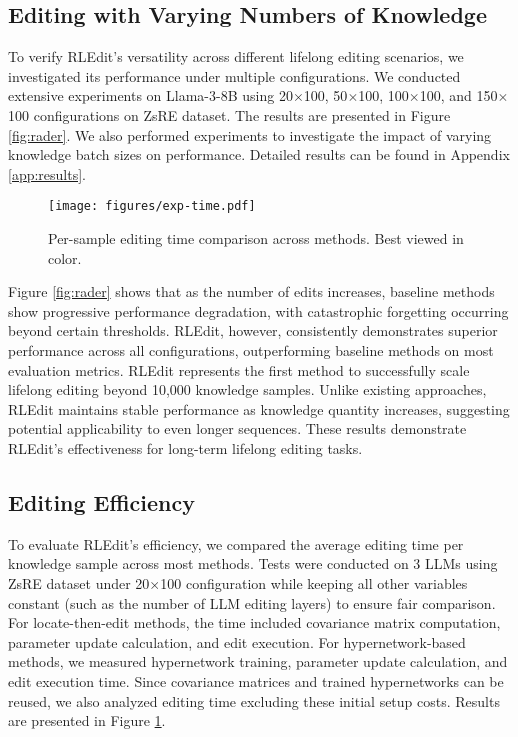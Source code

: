 \subsection{Editing with Varying Numbers of Knowledge}
To verify RLEdit's versatility across different lifelong editing scenarios, we investigated its performance under multiple configurations. We conducted extensive experiments on Llama-3-8B using 20$\times$100, 50$\times$100, 100$\times$100, and 150$\times$100 configurations on ZsRE dataset. The results are presented in Figure \ref{fig:rader}. We also performed experiments to investigate the impact of varying knowledge batch sizes on performance. Detailed results can be found in Appendix \ref{app:results}.

\begin{figure}
    \centering
    \texttt{[image: figures/exp-time.pdf]}
    \caption{Per-sample editing time comparison across methods. Best viewed in color.}
    \label{fig:time}

\end{figure}

Figure \ref{fig:rader} shows that as the number of edits increases, baseline methods show progressive performance degradation, with catastrophic forgetting occurring beyond certain thresholds. RLEdit, however, consistently demonstrates superior performance across all configurations, outperforming baseline methods on most evaluation metrics. RLEdit represents the first method to successfully scale lifelong editing beyond 10,000 knowledge samples. Unlike existing approaches, RLEdit maintains stable performance as knowledge quantity increases, suggesting potential applicability to even longer sequences. These results demonstrate RLEdit's effectiveness for long-term lifelong editing tasks.


\subsection{Editing Efficiency}
\label{section:4.4}
To evaluate RLEdit's efficiency, we compared the average editing time per knowledge sample across most methods. Tests were conducted on 3 LLMs using ZsRE dataset under 20$\times$100 configuration while keeping all other variables constant (such as the number of LLM editing layers) to ensure fair comparison. For locate-then-edit methods, the time included covariance matrix computation, parameter update calculation, and edit execution. For hypernetwork-based methods, we measured hypernetwork training, parameter update calculation, and edit execution time. Since covariance matrices and trained hypernetworks can be reused, we also analyzed editing time excluding these initial setup costs. Results are presented in Figure \ref{fig:time}. 

